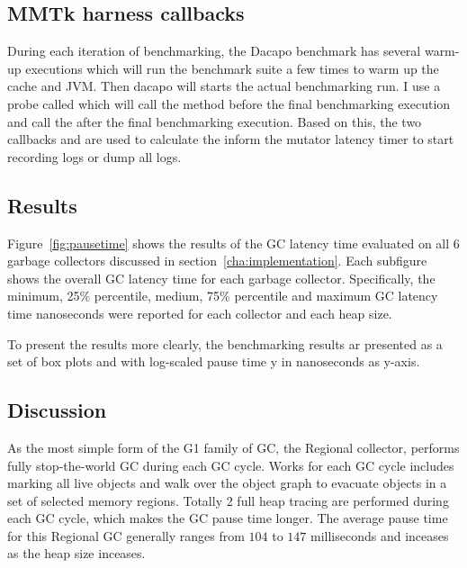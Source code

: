 \subsection{MMTk harness callbacks}

During each iteration of benchmarking, the Dacapo benchmark has several warm-up
executions which will run the benchmark suite a few times to warm up the cache and JVM.
Then dacapo will starts the actual benchmarking run. I use a probe called 
which will call the  method
before the final benchmarking execution and call the 
after the final benchmarking execution. Based on this, the two callbacks
 and  are used to calculate the inform the mutator
latency timer to start recording logs or dump all logs.

\subsection{Results}

\begin{table*}
  \centering
  \label{tab:pause}
  
  \caption{Results of the GC pause time}
\end{table*}

\begin{figure*}
  \centering
  \texttt{[image: \{figs/pause-time.png]}}
  \caption{Pause times of 6 collectors}
  \label{fig:pausetime}
\end{figure*}

Figure~\ref{fig:pausetime} shows the results of the GC latency time
evaluated on all 6 garbage collectors discussed in section~\ref{cha:implementation}.
Each subfigure shows
the overall GC latency time for each garbage collector. Specifically, the
minimum, 25\% percentile, medium, 75\% percentile and maximum GC latency time nanoseconds
were reported for each collector and each heap size.

To present the results more clearly, the benchmarking results ar presented as
a set of box plots and with log-scaled pause time y in nanoseconds as y-axis.

\subsection{Discussion}

As the most simple form of the G1 family of GC, the Regional collector, performs fully
stop-the-world GC during each GC cycle. Works for each GC cycle includes marking all
live objects and walk over the object graph to evacuate objects in a set of selected memory
regions. Totally 2 full heap tracing are performed during each GC cycle, which makes the GC
pause time longer. The average pause time for this Regional GC generally ranges from $104$ to $147$
milliseconds and inceases as the heap size inceases.

